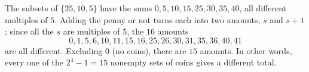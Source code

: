 The subsets of $\{25,10,5\}$ have the sums $0,5,10,15,25,30,35,40$, all different multiples of $5$. Adding the penny or not turns each into two amounts, $s$ and $s+1$; since all the $s$ are multiples of $5$, the $16$ amounts
\[
0,1,5,6,10,11,15,16,25,26,30,31,35,36,40,41
\]
are all different. Excluding $0$ (no coins), there are $\boxed{15}$ amounts. In other words, every one of the $2^4-1=15$ nonempty sets of coins gives a different total.

